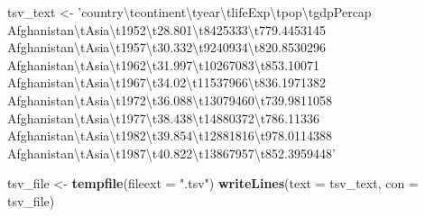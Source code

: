 \documentclass[
]{book}
\newenvironment{Shaded}{\begin{snugshade}}{\end{snugshade}}
\newcommand{\CharTok}[1]{\textcolor[rgb]{0.31,0.60,0.02}{#1}}
\newcommand{\DataTypeTok}[1]{\textcolor[rgb]{0.13,0.29,0.53}{#1}}
\newcommand{\KeywordTok}[1]{\textcolor[rgb]{0.13,0.29,0.53}{\textbf{#1}}}
\newcommand{\NormalTok}[1]{#1}
\newcommand{\StringTok}[1]{\textcolor[rgb]{0.31,0.60,0.02}{#1}}
\begin{document}
\begin{Shaded}
\begin{Highlighting}[]
\NormalTok{tsv_text <-}\StringTok{ }
\StringTok{'country}\CharTok{\textbackslash{}t}\StringTok{continent}\CharTok{\textbackslash{}t}\StringTok{year}\CharTok{\textbackslash{}t}\StringTok{lifeExp}\CharTok{\textbackslash{}t}\StringTok{pop}\CharTok{\textbackslash{}t}\StringTok{gdpPercap     }
\StringTok{Afghanistan}\CharTok{\textbackslash{}t}\StringTok{Asia}\CharTok{\textbackslash{}t}\StringTok{1952}\CharTok{\textbackslash{}t}\StringTok{28.801}\CharTok{\textbackslash{}t}\StringTok{8425333}\CharTok{\textbackslash{}t}\StringTok{779.4453145}
\StringTok{Afghanistan}\CharTok{\textbackslash{}t}\StringTok{Asia}\CharTok{\textbackslash{}t}\StringTok{1957}\CharTok{\textbackslash{}t}\StringTok{30.332}\CharTok{\textbackslash{}t}\StringTok{9240934}\CharTok{\textbackslash{}t}\StringTok{820.8530296}
\StringTok{Afghanistan}\CharTok{\textbackslash{}t}\StringTok{Asia}\CharTok{\textbackslash{}t}\StringTok{1962}\CharTok{\textbackslash{}t}\StringTok{31.997}\CharTok{\textbackslash{}t}\StringTok{10267083}\CharTok{\textbackslash{}t}\StringTok{853.10071}
\StringTok{Afghanistan}\CharTok{\textbackslash{}t}\StringTok{Asia}\CharTok{\textbackslash{}t}\StringTok{1967}\CharTok{\textbackslash{}t}\StringTok{34.02}\CharTok{\textbackslash{}t}\StringTok{11537966}\CharTok{\textbackslash{}t}\StringTok{836.1971382}
\StringTok{Afghanistan}\CharTok{\textbackslash{}t}\StringTok{Asia}\CharTok{\textbackslash{}t}\StringTok{1972}\CharTok{\textbackslash{}t}\StringTok{36.088}\CharTok{\textbackslash{}t}\StringTok{13079460}\CharTok{\textbackslash{}t}\StringTok{739.9811058}
\StringTok{Afghanistan}\CharTok{\textbackslash{}t}\StringTok{Asia}\CharTok{\textbackslash{}t}\StringTok{1977}\CharTok{\textbackslash{}t}\StringTok{38.438}\CharTok{\textbackslash{}t}\StringTok{14880372}\CharTok{\textbackslash{}t}\StringTok{786.11336}
\StringTok{Afghanistan}\CharTok{\textbackslash{}t}\StringTok{Asia}\CharTok{\textbackslash{}t}\StringTok{1982}\CharTok{\textbackslash{}t}\StringTok{39.854}\CharTok{\textbackslash{}t}\StringTok{12881816}\CharTok{\textbackslash{}t}\StringTok{978.0114388}
\StringTok{Afghanistan}\CharTok{\textbackslash{}t}\StringTok{Asia}\CharTok{\textbackslash{}t}\StringTok{1987}\CharTok{\textbackslash{}t}\StringTok{40.822}\CharTok{\textbackslash{}t}\StringTok{13867957}\CharTok{\textbackslash{}t}\StringTok{852.3959448'}

\NormalTok{tsv_file <-}\StringTok{ }\KeywordTok{tempfile}\NormalTok{(}\DataTypeTok{fileext =} \StringTok{".tsv"}\NormalTok{)}
\KeywordTok{writeLines}\NormalTok{(}\DataTypeTok{text =}\NormalTok{ tsv_text, }\DataTypeTok{con =}\NormalTok{ tsv_file)}
\end{Highlighting}
\end{Shaded}
\end{document}
